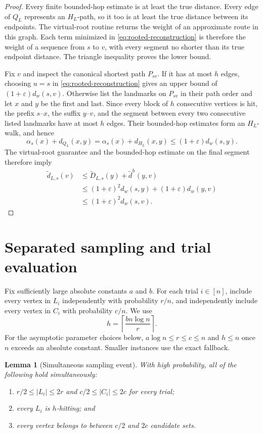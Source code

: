 \documentclass[11pt]{article}
\newtheorem{lemma}[theorem]{Lemma}
\theoremstyle{definition}
\newcommand{\eps}{\varepsilon}
\newcommand{\dist}{d_w}
\begin{document}
\begin{proof}
Every finite bounded-hop estimate is at least the true distance.  Every edge
of $Q_L$ represents an $H_L$-path, so it too is at least the true distance
between its endpoints.  The virtual-root routine returns the weight of an
approximate route in this graph.  Each term minimized in
\eqref{eq:rooted-reconstruction} is therefore the weight of a sequence from
$s$ to $v$, with every segment no shorter than its true endpoint distance.
The triangle inequality proves the lower bound.

Fix $v$ and inspect the canonical shortest path $P_{sv}$.  If it has at most
$h$ edges, choosing $u=s$ in \eqref{eq:rooted-reconstruction} gives an upper
bound of $(1+\eps)\dist(s,v)$.  Otherwise list the landmarks on $P_{sv}$ in
their path order and let $x$ and $y$ be the first and last.  Since every block
of $h$ consecutive vertices is hit, the prefix $s$--$x$, the suffix $y$--$v$,
and the segment between every two consecutive listed landmarks have at most
$h$ edges.  Their bounded-hop estimates form an $H_L$-walk, and hence
\[
  \alpha_s(x)+d_{Q_L}(x,y)
  =\alpha_s(x)+d_{H_L}(x,y)
  \leq(1+\eps)\dist(s,y).
\]
The virtual-root guarantee and the bounded-hop estimate on the final segment
therefore imply
\begin{align*}
  \widetilde d_{L,s}(v)
  &\leq \widetilde D_{L,s}(y)+\widetilde d^h(y,v)\\
  &\leq (1+\eps)^2\dist(s,y)
       +(1+\eps)\dist(y,v)\\
  &\leq (1+\eps)^2\dist(s,v).
\end{align*}
\end{proof}

\section{Separated sampling and trial evaluation}
\label{sec:algorithm}

Fix sufficiently large absolute constants $a$ and $b$.  For each trial
$i\in[n]$, include every vertex in $L_i$ independently with probability
$r/n$, and independently include every vertex in $C_i$ with probability
$c/n$.  We use
\[
  h=\left\lceil\frac{bn\log n}{r}\right\rceil.
  \tag{9}\label{eq:hitting-hop}
\]
For the asymptotic parameter choices below, $a\log n\leq r\leq c\leq n$
and $h\leq n$ once $n$ exceeds an absolute constant.  Smaller instances use
the exact fallback.

\begin{lemma}[Simultaneous sampling event]
\label{lem:sampling}
With high probability, all of the following hold simultaneously:
\begin{enumerate}[label=(\roman*)]
  \item $r/2\leq|L_i|\leq2r$ and $c/2\leq|C_i|\leq2c$ for every trial;
  \item every $L_i$ is $h$-hitting; and
  \item every vertex belongs to between $c/2$ and $2c$ candidate sets.
\end{enumerate}
\end{lemma}
\end{document}
